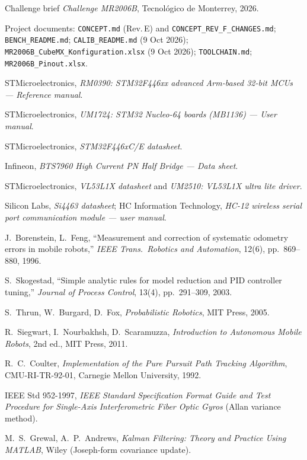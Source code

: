 \documentclass[11pt,a4paper]{article}
\newcommand{\code}[1]{\texttt{\small #1}}
\begin{document}
\begin{enumerate}[label={[\arabic*]},leftmargin=8mm,itemsep=2pt]
\small
\item Challenge brief \emph{Challenge MR2006B}, Tecnol\'ogico de Monterrey, 2026.
\item Project documents: \code{CONCEPT.md} (Rev.\,E) and \code{CONCEPT\_REV\_F\_CHANGES.md};
\code{BENCH\_README.md}; \code{CALIB\_README.md} (9 Oct 2026);
\code{MR2006B\_CubeMX\_Konfiguration.xlsx} (9 Oct 2026); \code{TOOLCHAIN.md};
\code{MR2006B\_Pinout.xlsx}.
\item STMicroelectronics, \emph{RM0390: STM32F446xx advanced Arm-based 32-bit MCUs ---
Reference manual}.
\item STMicroelectronics, \emph{UM1724: STM32 Nucleo-64 boards (MB1136) --- User manual}.
\item STMicroelectronics, \emph{STM32F446xC/E datasheet}.
\item Infineon, \emph{BTS7960 High Current PN Half Bridge --- Data sheet}.
\item STMicroelectronics, \emph{VL53L1X datasheet} and \emph{UM2510: VL53L1X ultra lite driver}.
\item Silicon Labs, \emph{Si4463 datasheet}; HC Information Technology, \emph{HC-12 wireless serial port communication module --- user manual}.
\item J.~Borenstein, L.~Feng, ``Measurement and correction of systematic odometry
errors in mobile robots,'' \emph{IEEE Trans.\ Robotics and Automation}, 12(6),
pp.\ 869--880, 1996.
\item S.~Skogestad, ``Simple analytic rules for model reduction and PID controller
tuning,'' \emph{Journal of Process Control}, 13(4), pp.\ 291--309, 2003.
\item S.~Thrun, W.~Burgard, D.~Fox, \emph{Probabilistic Robotics}, MIT Press, 2005.
\item R.~Siegwart, I.~Nourbakhsh, D.~Scaramuzza, \emph{Introduction to Autonomous
Mobile Robots}, 2nd ed., MIT Press, 2011.
\item R.~C.~Coulter, \emph{Implementation of the Pure Pursuit Path Tracking
Algorithm}, CMU-RI-TR-92-01, Carnegie Mellon University, 1992.
\item IEEE Std 952-1997, \emph{IEEE Standard Specification Format Guide and Test
Procedure for Single-Axis Interferometric Fiber Optic Gyros} (Allan variance
method).
\item M.~S.~Grewal, A.~P.~Andrews, \emph{Kalman Filtering: Theory and Practice
Using MATLAB}, Wiley (Joseph-form covariance update).
\end{enumerate}
\end{document}

